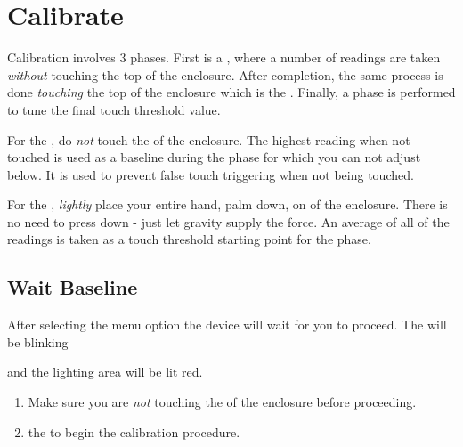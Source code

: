 \pagebreak
\section{Calibrate} \label{Touch Calibration} 

Calibration involves \num{3} phases.  First is a , where a number of
readings are taken \textit{without} touching the top of the enclosure.
After completion, the same process is done \textit{touching} the top of the
enclosure which is the .  Finally, a  phase is performed to
tune the final touch threshold value.

\par\medskip

For the , do \textit{not} touch the  of the enclosure.  The
highest reading when not touched is used as a baseline during the 
phase for which you can not adjust below.  It is used to prevent false touch
triggering when not being touched.

\par\medskip

For the , \textit{lightly} place your entire hand, palm down, on
 of the enclosure.  There is no need to press down - just let gravity
supply the force.  An average of all of the readings is taken as a touch
threshold starting point for the  phase.

\subsection{Wait Baseline} 

After selecting the  menu option the device will wait for you to
proceed.  The  will be blinking

\begin{figure}[H]
\centering
\end{figure}

and the lighting area will be lit red.

\begin{enumerate}
  \item Make sure you are \textit{not} touching the  of the enclosure
    before proceeding.
  \item {} the  to begin the calibration procedure.
\end{enumerate}

